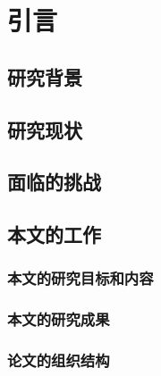 
\chapter{引言}
\label{chap:introduction}

\section{研究背景}
\section{研究现状}
\section{面临的挑战}
\section{本文的工作}
\subsection{本文的研究目标和内容}
\subsection{本文的研究成果}
\subsection{论文的组织结构}

